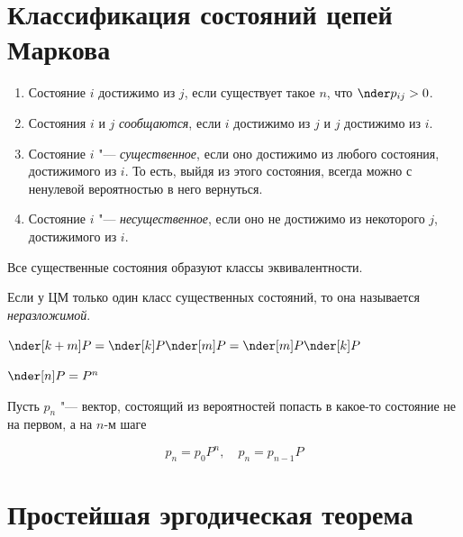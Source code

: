 \section{Классификация состояний цепей Маркова}

\begin{enumerate}
    \item Состояние $ i $ достижимо из $ j $, если существует такое $ n $, что $ \nder p_{ij} > 0 $.
    \item Состояния $ i $ и $ j $ \emph{сообщаются}, если $ i $ достижимо из $ j $ и $ j $
        достижимо из $ i $.
    \item Состояние $ i $ "--- \emph{существенное}, если оно достижимо из любого состояния,
        достижимого из $ i $.
        То есть, выйдя из этого состояния, всегда можно с ненулевой вероятностью в него вернуться.
    \item Состояние $ i $ "--- \emph{несущественное}, если оно не достижимо из некоторого $ j $,
        достижимого из $ i $.
\end{enumerate}

\begin{remark}
    Все существенные состояния образуют классы эквивалентности.
\end{remark}

\begin{definition}
    Если у ЦМ только один класс существенных состояний, то она называется \emph{неразложимой}.
\end{definition}

\begin{theorem}
    $ \nder[k + m]P = \nder[k]P \nder[m]P = \nder[m]P \nder[k]P $
\end{theorem}

\begin{implication}
    $ \nder[n]P = P^n $
\end{implication}

\begin{implication}
    Пусть $ p_n $ "--- вектор, состоящий из вероятностей попасть в какое-то состояние не на первом,
    а на $ n $-м шаге

    $$ p_n = p_0P^n, \quad p_n = p_{n - 1}P $$
\end{implication}

\section{Простейшая эргодическая теорема}

